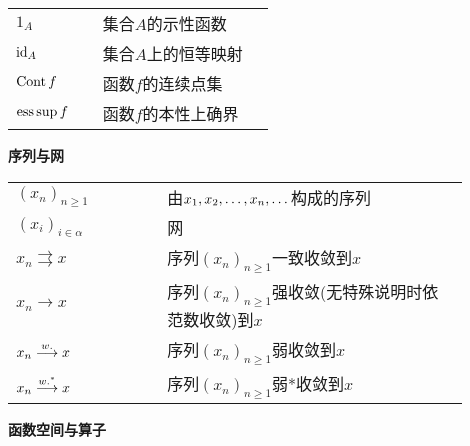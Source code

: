 \begin{tabular}{p{0.3\linewidth}p{0.6\linewidth}}
    $1_A$ & 集合$A$的示性函数\\
    $\mathrm{id}_A$ & 集合$A$上的恒等映射\\
    $\operatorname{Cont} f$ & 函数$f$的连续点集\\
    $\operatorname{ess\,sup} f$ & 函数$f$的本性上确界\\
\end{tabular}

\vspace{2.5ex}
\noindent\textbf{序列与网}
\vspace{1.5ex}

\begin{tabular}{p{0.3\linewidth}p{0.6\linewidth}}
    $(x_n)_{n\geqslant 1}$ & 由$x_{1}, x_{2}, \dots, x_{n},\dots$构成的序列\\
    $(x_i)_{i\in\alpha}$ & 网\\
    $x_n\rightrightarrows x$ & 序列$(x_n)_{n\geqslant 1}$一致收敛到$x$\\
    $x_n\to x$ & 序列$(x_n)_{n\geqslant 1}$强收敛(无特殊说明时依范数收敛)到$x$\\
    $x_n\overset{w.}{\longrightarrow} x$ & 序列$(x_n)_{n\geqslant 1}$弱收敛到$x$\\
    $x_n\overset{w.^{*}}{\longrightarrow} x$ & 序列$(x_n)_{n\geqslant 1}$弱*收敛到$x$
\end{tabular}

\vspace{2.5ex}
\noindent\textbf{函数空间与算子}
\vspace{1.5ex}


